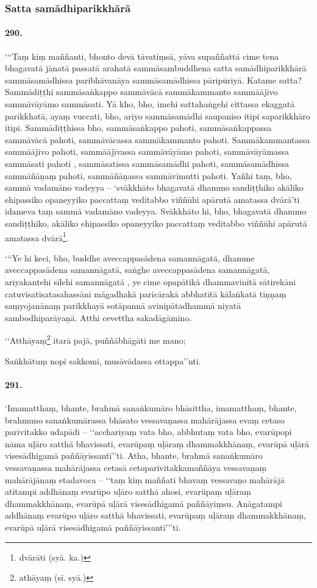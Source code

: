 \subsubsection{Satta samādhiparikkhārā}

\paragraph{290.} ‘‘‘Taṃ kiṃ maññanti, bhonto devā tāvatiṃsā, yāva supaññattā cime tena bhagavatā jānatā passatā arahatā sammāsambuddhena satta samādhiparikkhārā sammāsamādhissa paribhāvanāya sammāsamādhissa pāripūriyā. Katame satta? Sammādiṭṭhi sammāsaṅkappo sammāvācā sammākammanto sammāājīvo sammāvāyāmo sammāsati. Yā kho, bho, imehi sattahaṅgehi cittassa ekaggatā parikkhatā, ayaṃ vuccati, bho, ariyo sammāsamādhi saupaniso itipi saparikkhāro itipi. Sammādiṭṭhissa bho, sammāsaṅkappo pahoti, sammāsaṅkappassa sammāvācā pahoti, sammāvācassa sammākammanto pahoti. Sammākammantassa sammāājīvo pahoti, sammāājīvassa sammāvāyāmo pahoti, sammāvāyāmassa sammāsati pahoti , sammāsatissa sammāsamādhi pahoti, sammāsamādhissa sammāñāṇaṃ pahoti, sammāñāṇassa sammāvimutti pahoti. Yañhi taṃ, bho, sammā vadamāno vadeyya – ‘svākkhāto bhagavatā dhammo sandiṭṭhiko akāliko ehipassiko opaneyyiko paccattaṃ veditabbo viññūhi apārutā amatassa dvārā’ti idameva taṃ sammā vadamāno vadeyya. Svākkhāto hi, bho, bhagavatā dhammo sandiṭṭhiko, akāliko ehipassiko opaneyyiko paccattaṃ veditabbo viññūhi apārutā amatassa dvārā\footnote{dvārāti (syā. ka.)}.

‘‘‘Ye hi keci, bho, buddhe aveccappasādena samannāgatā, dhamme aveccappasādena samannāgatā, saṅghe aveccappasādena samannāgatā, ariyakantehi sīlehi samannāgatā , ye cime opapātikā dhammavinītā sātirekāni catuvīsatisatasahassāni māgadhakā paricārakā abbhatītā kālaṅkatā tiṇṇaṃ saṃyojanānaṃ parikkhayā sotāpannā avinipātadhammā niyatā sambodhiparāyaṇā. Atthi cevettha sakadāgāmino.

‘‘Atthāyaṃ\footnote{athāyaṃ (sī. syā.)} itarā pajā, puññābhāgāti me mano;

Saṅkhātuṃ nopi sakkomi, musāvādassa ottappa’’nti.

\paragraph{291.} ‘Imamatthaṃ, bhante, brahmā sanaṅkumāro bhāsittha, imamatthaṃ, bhante, brahmuno sanaṅkumārassa bhāsato vessavaṇassa mahārājassa evaṃ cetaso parivitakko udapādi – ‘‘acchariyaṃ vata bho, abbhutaṃ vata bho, evarūpopi nāma uḷāro satthā bhavissati, evarūpaṃ uḷāraṃ dhammakkhānaṃ, evarūpā uḷārā visesādhigamā paññāyissantī’’ti. Atha, bhante, brahmā sanaṅkumāro vessavaṇassa mahārājassa cetasā cetoparivitakkamaññāya vessavaṇaṃ mahārājānaṃ etadavoca – ‘‘taṃ kiṃ maññati bhavaṃ vessavaṇo mahārājā atītampi addhānaṃ evarūpo uḷāro satthā ahosi, evarūpaṃ uḷāraṃ dhammakkhānaṃ, evarūpā uḷārā visesādhigamā paññāyiṃsu. Anāgatampi addhānaṃ evarūpo uḷāro satthā bhavissati, evarūpaṃ uḷāraṃ dhammakkhānaṃ, evarūpā uḷārā visesādhigamā paññāyissantī’’’ti.

